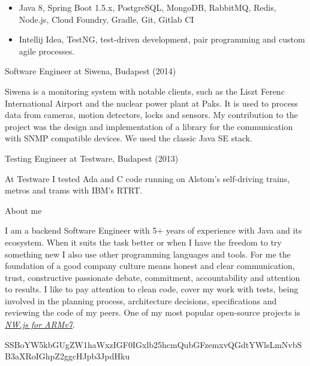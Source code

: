 \documentclass[hidelinks,11pt]{friggeri-cv}
\newenvironment{experience}{\begin{adjustwidth}{-4.6cm}{}}{\end{adjustwidth}}
\begin{document}
\begin{experience}
\begin{itemize}
	\item Java 8, Spring Boot 1.5.x, PostgreSQL, MongoDB, RabbitMQ, Redis, Node.js, Cloud Foundry, Gradle, Git, Gitlab CI
	\item Intellij Idea, TestNG, test-driven development, pair programming and custom agile processes.
\end{itemize}

{\LARGE Software Engineer at Siwena, Budapest (2014)}

Siwena is a monitoring system with notable clients, such as the Liszt Ferenc International Airport and the nuclear power plant at Paks.
It is used to process data from cameras, motion detectors, locks and sensors.
My contribution to the project was the design and implementation of a library for the communication with SNMP compatible devices.
We used the classic Java SE stack.

{\LARGE Testing Engineer at Testware, Budapest (2013)}

At Testware I tested Ada and C code running on Alstom's self-driving trains, metros and trams with IBM's RTRT.

{\LARGE About me}

I am a backend Software Engineer with 5+ years of experience with Java and its ecosystem.
When it suits the task better or when I have the freedom to try something new I also use other programming languages and tools.
For me the foundation of a good company culture means honest and clear communication, trust, constructive passionate debate, commitment, accountability and attention to results.
I like to pay attention to clean code, cover my work with tests, being involved in the planning process, architecture decisions, specifications and reviewing the code of my peers.
One of my most popular open-source projects is \href{https://github.com/LeonardLaszlo/nw.js-armv7-binaries}{\textit{NW.js for ARMv7}}.

SSBoYW5kbGUgZW1haWxzIGF0IGxlb25hcmQubGFzemxvQGdtYWlsLmNvbSB3aXRoIGhpZ2ggcHJpb3JpdHku

\end{experience}
\end{document}
